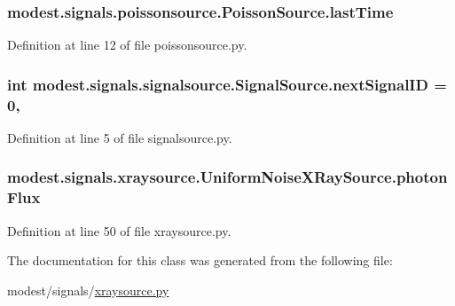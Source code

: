 \subsubsection[{\texorpdfstring{last\+Time}{lastTime}}]{\setlength{\rightskip}{0pt plus 5cm}modest.\+signals.\+poissonsource.\+Poisson\+Source.\+last\+Time\hspace{0.3cm}{\ttfamily [inherited]}}\hypertarget{classmodest_1_1signals_1_1poissonsource_1_1PoissonSource_a34395fc83bd8743a0a5ee69f9392a606}{}\label{classmodest_1_1signals_1_1poissonsource_1_1PoissonSource_a34395fc83bd8743a0a5ee69f9392a606}


Definition at line 12 of file poissonsource.\+py.

\subsubsection[{\texorpdfstring{next\+Signal\+ID}{nextSignalID}}]{\setlength{\rightskip}{0pt plus 5cm}int modest.\+signals.\+signalsource.\+Signal\+Source.\+next\+Signal\+ID = 0\hspace{0.3cm}{\ttfamily [static]}, {\ttfamily [inherited]}}\hypertarget{classmodest_1_1signals_1_1signalsource_1_1SignalSource_a453eafb550b551adbec0903deb63dfce}{}\label{classmodest_1_1signals_1_1signalsource_1_1SignalSource_a453eafb550b551adbec0903deb63dfce}


Definition at line 5 of file signalsource.\+py.

\subsubsection[{\texorpdfstring{photon\+Flux}{photonFlux}}]{\setlength{\rightskip}{0pt plus 5cm}modest.\+signals.\+xraysource.\+Uniform\+Noise\+X\+Ray\+Source.\+photon\+Flux}\hypertarget{classmodest_1_1signals_1_1xraysource_1_1UniformNoiseXRaySource_a9b8049972baf6e0640181b58850a3d20}{}\label{classmodest_1_1signals_1_1xraysource_1_1UniformNoiseXRaySource_a9b8049972baf6e0640181b58850a3d20}


Definition at line 50 of file xraysource.\+py.



The documentation for this class was generated from the following file\+:\begin{DoxyCompactItemize}
\item 
modest/signals/\hyperlink{xraysource_8py}{xraysource.\+py}\end{DoxyCompactItemize}
